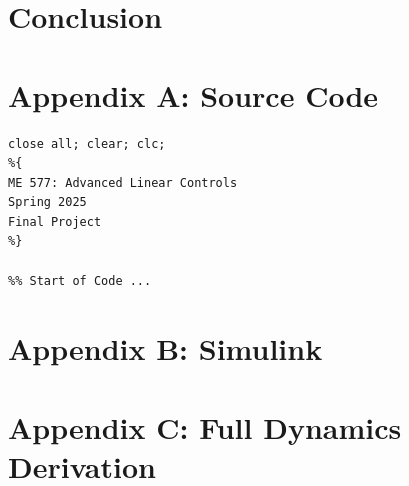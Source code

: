 \documentclass[titlepage]{article}
\begin{document}
\newpage
\section{Conclusion}

\newpage
\section{Appendix A: Source Code}
\begin{lstlisting}[style=Matlab-editor]
close all; clear; clc;
%{
ME 577: Advanced Linear Controls
Spring 2025
Final Project
%}

%% Start of Code ...

\end{lstlisting}

\newpage
\section{Appendix B: Simulink}

\newpage
\section{Appendix C: Full Dynamics Derivation}
\end{document}
